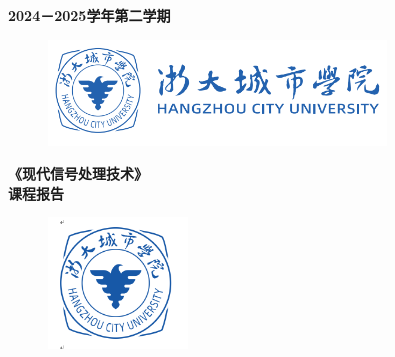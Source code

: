 \documentclass{article}
\newcommand{\sizethirty}{\fontsize{30pt}{50pt}}  %
\begin{document}

\pagestyle{empty}
\begin{flushright}
{
     {\simsuntext {} \bfseries 2024－2025学年第二学期}
    
}
\end{flushright}


\begin{figure}[h]
    \centering
    \includegraphics[width=0.8\textwidth]{./城院logo3.png}
\end{figure}
\begin{center}
    {\hwtext\bfseries\sizethirty 
    《现代信号处理技术》\\[1.5\baselineskip]  %
    课程报告}
\end{center}
\begin{figure}[h]
    \centering
    \includegraphics[width=0.33\textwidth]{./城院logo2.png}
\end{figure}

\newcommand{\fssi}{\fangsong\zihao{4}}
\end{document}
